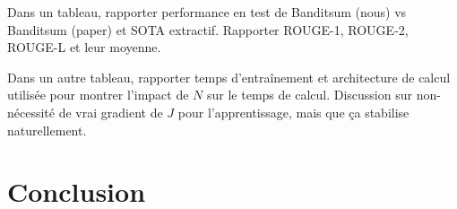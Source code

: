 Dans un tableau, rapporter performance en test de Banditsum (nous) vs Banditsum (paper) et
SOTA extractif.
Rapporter ROUGE-1, ROUGE-2, ROUGE-L et leur moyenne.

Dans un autre tableau, rapporter temps d'entraînement et architecture de calcul 
utilisée pour montrer l'impact de $N$ sur le temps de calcul.
Discussion sur non-nécessité de vrai gradient de $J$ pour l'apprentissage, mais que
ça stabilise naturellement.

\section{Conclusion}


